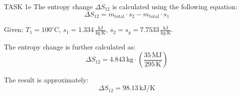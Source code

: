 TASK 1e  
The entropy change \( \Delta S_{12} \) is calculated using the following equation:  
\[
\Delta S_{12} = m_{\text{total}} \cdot s_2 - m_{\text{total}} \cdot s_1
\]  

Given:  
\( T_1 = 100^\circ\text{C} \),  
\( s_1 = 1.334 \, \frac{\text{kJ}}{\text{kg·K}} \),  
\( s_2 = s_g = 7.7533 \, \frac{\text{kJ}}{\text{kg·K}} \).  

The entropy change is further calculated as:  
\[
\Delta S_{12} = 4.843 \, \text{kg} \cdot \left( \frac{35 \, \text{MJ}}{295 \, \text{K}} \right)
\]  

The result is approximately:  
\[
\Delta S_{12} = 98.13 \, \text{kJ/K}
\]